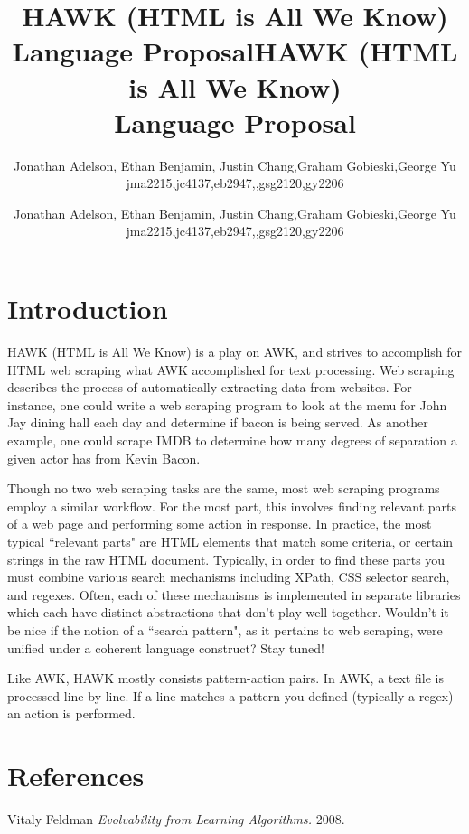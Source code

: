 \documentclass[12pt]{article}
\title{HAWK (HTML is All We Know)\\
Language Proposal}
\author{Jonathan Adelson, Ethan Benjamin, Justin Chang,Graham Gobieski,George Yu\\
jma2215,jc4137,eb2947,,gsg2120,gy2206}
\date{}
\newcommand{\setdocdata}{
\title{HAWK (HTML is All We Know)\\
Language Proposal}
\author{Jonathan Adelson, Ethan Benjamin, Justin Chang,Graham Gobieski,George Yu\\
jma2215,jc4137,eb2947,,gsg2120,gy2206}
\date{}
}
\begin{document}
 

\setdocdata
\maketitle

\section*{Introduction}

HAWK (HTML is All We Know) is a play on AWK, and strives to accomplish for HTML web scraping what AWK accomplished for text processing. Web scraping describes the process of automatically extracting data from websites. For instance, one could write a web scraping program to look at the menu for John Jay dining hall each day and determine if bacon is being served. As another example, one could scrape IMDB to determine how many degrees of separation a given actor has from Kevin Bacon. 

Though no two web scraping tasks are the same, most web scraping programs employ a similar workflow. For the most part, this involves finding relevant parts of a web page and performing some action in response. In practice, the most typical ``relevant parts" are HTML elements that match some criteria, or certain strings in the raw HTML document. Typically, in order to find these parts you must combine various search mechanisms including XPath, CSS selector search, and regexes. Often, each of these mechanisms is implemented in separate libraries which each have distinct abstractions that don't play well together. Wouldn't it be nice if the notion of a ``search pattern", as it pertains to web scraping, were unified under a coherent language construct? Stay tuned!

 Like AWK, HAWK mostly consists pattern-action pairs. In AWK, a text file is processed line by line. If a line matches a pattern you defined (typically a regex) an action is performed. 



\section*{References}

 \begin{thebibliography}{1}
  
    Vitaly Feldman  {\em Evolvability from Learning Algorithms.}  2008.


  \end{thebibliography}
\end{document}
